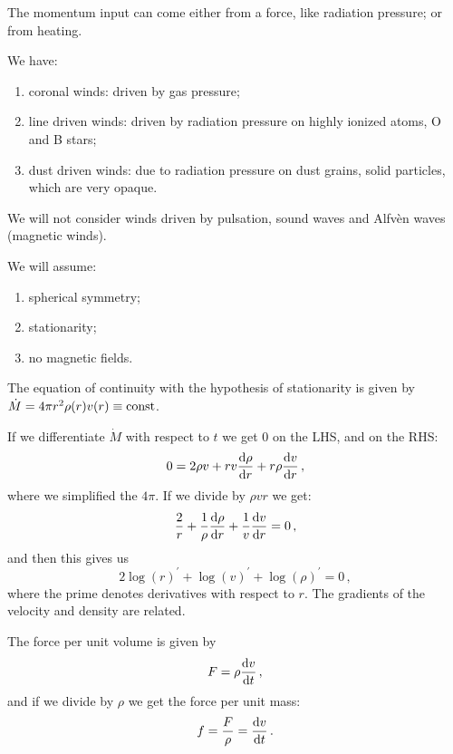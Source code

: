 \documentclass[main.tex]{subfiles}
\begin{document}
The momentum input can come either from a force, like radiation pressure; or from heating.

We have:
\begin{enumerate}
    \item coronal winds: driven by gas pressure;
    \item line driven winds: driven by radiation pressure on highly ionized atoms, O and B stars;
    \item dust driven winds: due to radiation pressure on dust grains, solid particles, which are very opaque.
\end{enumerate}


We will not consider winds driven by pulsation, sound waves and Alfvèn waves (magnetic winds).

We will assume:
\begin{enumerate}
    \item spherical symmetry;
    \item stationarity;
    \item no magnetic fields.
\end{enumerate}

The equation of continuity with the hypothesis of stationarity is given by \(\dot{M} = 4 \pi r^2 \rho (r) v(r) \equiv \text{const}\).

If we differentiate \(\dot{M} \) with respect to \(t\) we get 0 on the LHS, and on the RHS: 
%
\begin{equation}
  0 = 2 \rho v + rv \dv{\rho }{r} + r \rho \dv{v}{r} 
\,,
\end{equation}
%
where we simplified the \(4 \pi \). If we divide by \(\rho v r \) we get: 
%
\begin{equation}
  \frac{2}{r} + \frac{1}{\rho }\dv{\rho }{r} + \frac{1}{v} \dv{v}{r} =0     
\,,
\end{equation}
%
and then this gives us 
%
\begin{equation}
  2\log(r)^{\prime } + \log(v)^{\prime } + \log(\rho)^{\prime } =0
\,,
\end{equation}
%
where the prime denotes derivatives with respect to \(r\).
The gradients of the velocity and density are related.

The force per unit volume is given by 
%
\begin{equation}
  F = \rho \dv{v}{t} 
\,,
\end{equation}
%
and if we divide by \(\rho \) we get the force per unit mass: 
%
\begin{equation}
  f = \frac{F}{\rho } = \dv{v}{t}  
\,.
\end{equation}
\end{document}
